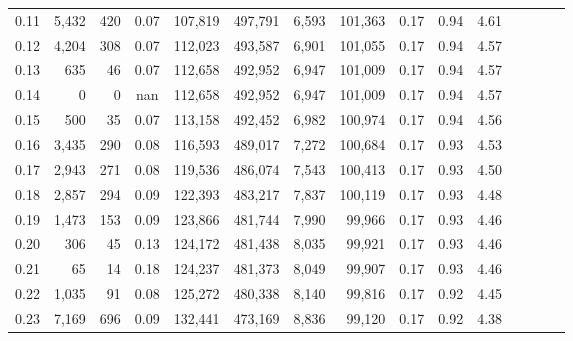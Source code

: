 \begin{tabular}{rrrcrrrrrrrrrrr}
0.11 &   5,432 &    420 &                                       0.07 &  107,819 &  497,791 &    6,593 &  101,363 &  0.17 &  0.94 &                         4.61 \\
0.12 &   4,204 &    308 &                                       0.07 &  112,023 &  493,587 &    6,901 &  101,055 &  0.17 &  0.94 &                         4.57 \\
0.13 &     635 &     46 &                                       0.07 &  112,658 &  492,952 &    6,947 &  101,009 &  0.17 &  0.94 &                         4.57 \\
0.14 &       0 &      0 &                                        nan &  112,658 &  492,952 &    6,947 &  101,009 &  0.17 &  0.94 &                         4.57 \\
0.15 &     500 &     35 &                                       0.07 &  113,158 &  492,452 &    6,982 &  100,974 &  0.17 &  0.94 &                         4.56 \\
0.16 &   3,435 &    290 &                                       0.08 &  116,593 &  489,017 &    7,272 &  100,684 &  0.17 &  0.93 &                         4.53 \\
0.17 &   2,943 &    271 &                                       0.08 &  119,536 &  486,074 &    7,543 &  100,413 &  0.17 &  0.93 &                         4.50 \\
0.18 &   2,857 &    294 &                                       0.09 &  122,393 &  483,217 &    7,837 &  100,119 &  0.17 &  0.93 &                         4.48 \\
0.19 &   1,473 &    153 &                                       0.09 &  123,866 &  481,744 &    7,990 &   99,966 &  0.17 &  0.93 &                         4.46 \\
0.20 &     306 &     45 &                                       0.13 &  124,172 &  481,438 &    8,035 &   99,921 &  0.17 &  0.93 &                         4.46 \\
0.21 &      65 &     14 &                                       0.18 &  124,237 &  481,373 &    8,049 &   99,907 &  0.17 &  0.93 &                         4.46 \\
0.22 &   1,035 &     91 &                                       0.08 &  125,272 &  480,338 &    8,140 &   99,816 &  0.17 &  0.92 &                         4.45 \\
0.23 &   7,169 &    696 &                                       0.09 &  132,441 &  473,169 &    8,836 &   99,120 &  0.17 &  0.92 &                         4.38 \\

\end{tabular}
